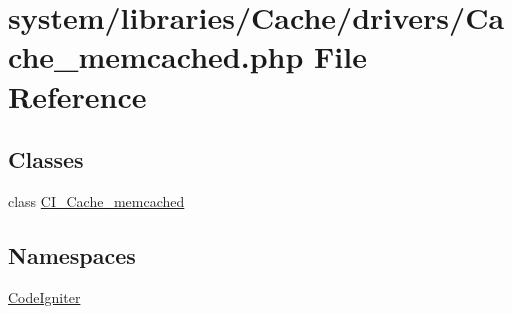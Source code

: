 \hypertarget{_cache__memcached_8php}{}\section{system/libraries/\+Cache/drivers/\+Cache\+\_\+memcached.php File Reference}
\label{_cache__memcached_8php}
\subsection*{Classes}
\begin{DoxyCompactItemize}
\item 
class \mbox{\hyperlink{class_c_i___cache__memcached}{C\+I\+\_\+\+Cache\+\_\+memcached}}
\end{DoxyCompactItemize}
\subsection*{Namespaces}
\begin{DoxyCompactItemize}
\item 
 \mbox{\hyperlink{namespace_code_igniter}{Code\+Igniter}}
\end{DoxyCompactItemize}
